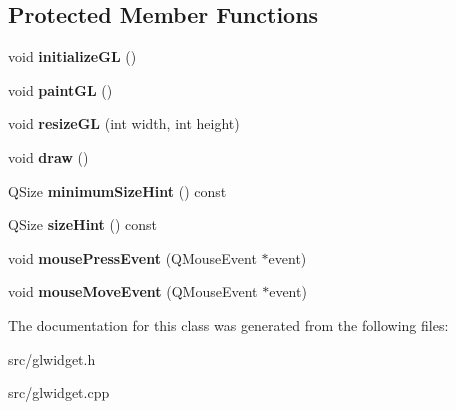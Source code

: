 \subsection*{Protected Member Functions}
\begin{DoxyCompactItemize}
\item 
\mbox{\label{class_glwidget_a5f266609dcd89e1291539a498ce42cbb}} 
void {\bfseries initialize\+GL} ()
\item 
\mbox{\label{class_glwidget_a440fe507a9bd647c1a961cf72305da31}} 
void {\bfseries paint\+GL} ()
\item 
\mbox{\label{class_glwidget_a36bd98ea1696cf1a7f5830fde3a16a72}} 
void {\bfseries resize\+GL} (int width, int height)
\item 
\mbox{\label{class_glwidget_ac54d1b859e11037f3e86f3193e84970b}} 
void {\bfseries draw} ()
\item 
\mbox{\label{class_glwidget_a9768cbeb06b6ccfaff47ff443dda1c98}} 
Q\+Size {\bfseries minimum\+Size\+Hint} () const
\item 
\mbox{\label{class_glwidget_a0dfc5b597184e106d7bcf921ba24b09a}} 
Q\+Size {\bfseries size\+Hint} () const
\item 
\mbox{\label{class_glwidget_a0e3f033e0fa941505114a32d35823c70}} 
void {\bfseries mouse\+Press\+Event} (Q\+Mouse\+Event $\ast$event)
\item 
\mbox{\label{class_glwidget_afc8a6da76c5ead92b1c1a4ba8f931310}} 
void {\bfseries mouse\+Move\+Event} (Q\+Mouse\+Event $\ast$event)
\end{DoxyCompactItemize}


The documentation for this class was generated from the following files\+:\begin{DoxyCompactItemize}
\item 
src/glwidget.\+h\item 
src/glwidget.\+cpp\end{DoxyCompactItemize}
